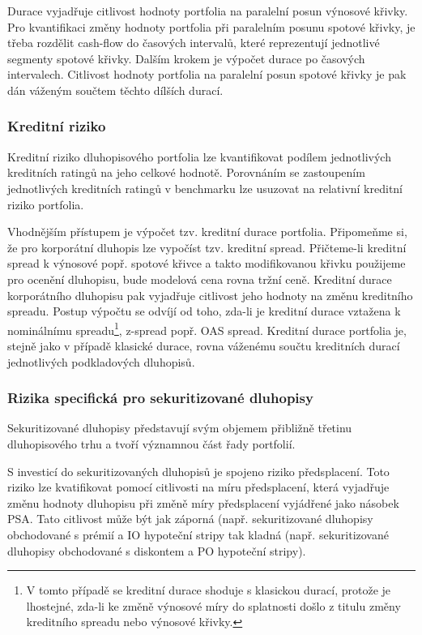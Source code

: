 \documentclass[a4paper]{book}
\begin{document}
Durace vyjadřuje citlivost hodnoty portfolia na paralelní posun výnosové křivky. Pro kvantifikaci změny hodnoty portfolia při paralelním posunu spotové křivky, je třeba rozdělit cash-flow do časových intervalů, které reprezentují jednotlivé segmenty spotové křivky. Dalším krokem je výpočet durace po časových intervalech. Citlivost hodnoty portfolia na paralelní posun spotové křivky je pak dán váženým součtem těchto dílších durací.

\subsubsection{Kreditní riziko}

Kreditní riziko dluhopisového portfolia lze kvantifikovat podílem jednotlivých kreditních ratingů na jeho celkové hodnotě. Porovnáním se zastoupením jednotlivých kreditních ratingů v benchmarku lze usuzovat na relativní kreditní riziko portfolia.

Vhodnějším přístupem je výpočet tzv. kreditní durace portfolia. Připomeňme si, že pro korporátní dluhopis lze vypočíst tzv. kreditní spread. Přičteme-li kreditní spread k výnosové popř. spotové křivce a takto modifikovanou křivku použijeme pro ocenění dluhopisu, bude modelová cena rovna tržní ceně. Kreditní durace korporátního dluhopisu pak vyjadřuje citlivost jeho hodnoty na změnu kreditního spreadu. Postup výpočtu se odvíjí od toho, zda-li je kreditní durace vztažena k nominálnímu spreadu\footnote{V tomto případě se kreditní durace shoduje s klasickou durací, protože je lhostejné, zda-li ke změně výnosové míry do splatnosti došlo z titulu změny kreditního spreadu nebo výnosové křivky.}, z-spread popř. OAS spread. Kreditní durace portfolia je, stejně jako v případě klasické durace, rovna váženému součtu kreditních durací jednotlivých podkladových dluhopisů. 

\subsubsection{Rizika specifická pro sekuritizované dluhopisy}

Sekuritizované dluhopisy představují svým objemem přibližně třetinu dluhopisového trhu a tvoří významnou část řady portfolií.

S investicí do sekuritizovaných dluhopisů je spojeno riziko předsplacení. Toto riziko lze kvatifikovat pomocí citlivosti na míru předsplacení, která vyjadřuje změnu hodnoty dluhopisu při změně míry předsplacení vyjádřené jako násobek PSA. Tato citlivost může být jak záporná (např. sekuritizované dluhopisy obchodované s prémií a IO hypoteční stripy tak kladná (např. sekuritizované dluhopisy obchodované s diskontem a PO hypoteční stripy).
\end{document}
